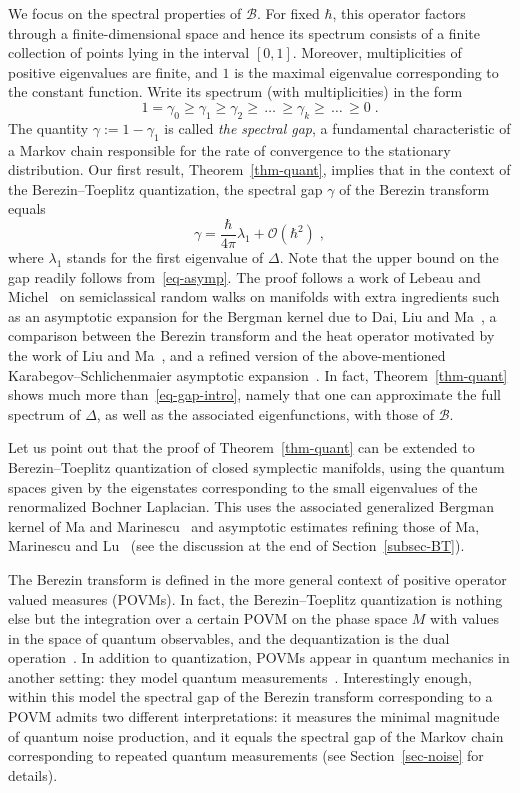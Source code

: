 \documentclass[11pt]{article}
\theoremstyle{definition}
\numberwithin{equation}{section}
\numberwithin{figure}{section}
\numberwithin{table}{section}
\newcommand{\cB}{{\mathcal{B}}}
\newcommand{\bigo}{\mathcal{O}}
\renewcommand\geq {\geqslant}
\newcommand\< {\mathcal{h}}
\renewcommand\> {\mathcal{i}}
\begin{document}
We focus on the spectral properties of $\cB$. For fixed $\hbar$, this operator factors through a finite-dimensional space and hence its spectrum consists of a finite collection of points lying in the interval $[0,1]$. Moreover, multiplicities of positive eigenvalues are finite, and $1$ is the maximal eigenvalue corresponding to the constant function. Write its spectrum (with multiplicities) in the form
\[
1=\gamma_0
\geq \gamma_1 \geq \gamma_2\geq\,\dots\, \geq \gamma_k \geq\,\dots\,\geq 0\;.
\]
The quantity $\gamma:= 1-\gamma_1$ is called \emph{the spectral gap}, a fundamental characteristic of a Markov chain responsible for the rate of convergence to the stationary distribution. Our first result, Theorem~\ref{thm-quant}, implies that in the context of the Berezin--Toeplitz quantization, the spectral gap $\gamma$ of the Berezin transform equals
\begin{equation}\label{eq-gap-intro}
\gamma = \frac{\hbar}{4\pi}\lambda_1 + \bigo(\hbar^2)\;,
\end{equation}
where $\lambda_1$ stands for the first eigenvalue of $\Delta$. Note that the upper bound on the gap readily follows from~\eqref{eq-asymp}. The proof follows a work of Lebeau and Michel~\cite{LM} on semiclassical random walks on manifolds with extra ingredients such as an asymptotic expansion for the Bergman kernel due to Dai, Liu and Ma~\cite{DLM06}, a comparison between the Berezin transform and the heat operator motivated by the work of Liu and Ma~\cite{LM07}, and a refined version of the above-mentioned Karabegov--Schlichenmaier asymptotic expansion~\cite{KS01}. In fact, Theorem~\ref{thm-quant} shows much more than~\eqref{eq-gap-intro}, namely that one can approximate the full spectrum of $\Delta$, as well as the associated eigenfunctions, with those of $\cB$.

Let us point out that the proof of Theorem~\ref{thm-quant} can be extended to Berezin--Toeplitz quantization of closed symplectic manifolds, using the quantum spaces given by the eigenstates corresponding to the small eigenvalues of the renormalized Bochner Laplacian. This uses the associated generalized Bergman kernel of Ma and Marinescu~\cite{MM08} and asymptotic estimates refining those of Ma, Marinescu and Lu~\cite{LMM16} (see the discussion at the end of Section~\ref{subsec-BT}).


The Berezin transform is defined in the more general context of positive operator valued measures (POVMs). In fact, the Berezin--Toeplitz quantization is nothing else but the integration over a certain POVM on the phase space $M$ with values in the space of quantum observables, and the dequantization is the dual operation~\cite{CP,La}. In addition to quantization, POVMs appear in quantum mechanics in another setting: they model quantum measurements~\cite{Busch-2}. Interestingly enough, within this model the spectral gap of the Berezin transform corresponding to a POVM admits two different interpretations: it measures the minimal magnitude of quantum noise production, and it equals the spectral gap of the Markov chain corresponding to repeated quantum measurements (see Section~\ref{sec-noise} for details).
\end{document}
